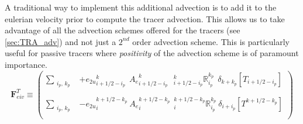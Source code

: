 \documentclass[../tex_main/NEMO_manual]{subfiles}
\begin{document}
A traditional way to implement this additional advection is to add it to the eulerian velocity prior to
compute the tracer advection.
This allows us to take advantage of all the advection schemes offered for the tracers
(see \autoref{sec:TRA_adv}) and not just a $2^{nd}$ order advection scheme.
This is particularly useful for passive tracers where
\emph{positivity} of the advection scheme is of paramount importance. 
\begin{equation} \label{eq:eiv_vd}  
\textbf{F}_{eiv}^T   \equiv   \left( \begin{aligned}                                
 \sum_{\substack{i_p,\,k_p}} &
 +{e_{2u}}_{i+1/2-i_p}^{k}                                  \ \ {A_{e}}_{i+1/2-i_p}^{k} 
\ \ \ { _{i+1/2-i_p}^k \mathbb{R}_{i_p}^{k_p} }    \ \ \delta_{k+k_p}[T_{i+1/2-i_p}]      \\
    \\
 \sum_{\substack{i_p,\,k_p}} &
 - {e_{2u}}_i^{k+1/2-k_p}                                      \ {A_{e}}_i^{k+1/2-k_p} 
\ \ { _i^{k+1/2-k_p} \mathbb{R}_{i_p}^{k_p} }    \ \delta_{i+i_p}[T^{k+1/2-k_p}]    \\   
\end{aligned}   \right)
\end{equation}
\end{document}
